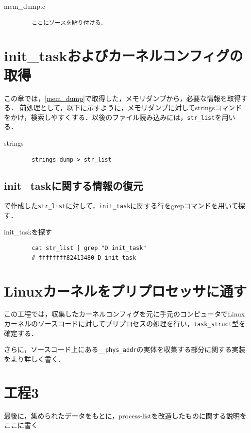\begin{itembox}[l]{mem_dump.c}
    \begin{verbatim}
        ここにソースを貼り付ける．
    \end{verbatim}
\end{itembox}

\section{init\_taskおよびカーネルコンフィグの取得}
\label{section:strings}

この章では，\ref{mem_dump}で取得した，メモリダンプから，必要な情報を取得する．
前処理として，以下に示すように，メモリダンプに対してstringsコマンドをかけ，検索しやすくする．以後のファイル読み込みには，\verb|str_list|を用いる．

\begin{itembox}[l]{strings}
    \begin{verbatim}
        strings dump > str_list
    \end{verbatim}
\end{itembox}

\subsection{init\_taskに関する情報の復元}

\label{section:mem_dump}で作成した\verb|str_list|に対して，\verb|init_task|に関する行をgrepコマンドを用いて探す．

\begin{itembox}[l]{init_taskを探す}
    \begin{verbatim}
        cat str_list | grep "D init_task"
        # ffffffff82413480 D init_task
    \end{verbatim}
\end{itembox}

\section{Linuxカーネルをプリプロセッサに通す}

この工程では，収集したカーネルコンフィグを元に手元のコンピュータでLinuxカーネルのソースコードに対してプリプロセスの処理を行い，\verb|task_struct|型を確定する．

さらに，ソースコード上にある\verb|__phys_addr|の実体を収集する部分に関する実装をより詳しく書く．

\section{工程3}

最後に，集められたデータをもとに，process-listを改造したものに関する説明をここに書く
